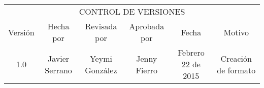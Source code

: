 %
\begin{table}[H]
	\centering
	\begin{tabular}{| c | c | c | c | c | c | }
	\hline
	\multicolumn{6}{c}{CONTROL DE VERSIONES} \\
	\cline{1-6}\noalign{\smallskip}
	\hline
	Versi\'on & Hecha por & Revisada por & Aprobada por & Fecha & Motivo \\ \hline
	 1.0 & Javier Serrano & Yeymi Gonz\'alez & Jenny Fierro & Febrero 22 de 2015 & Creaci\'on de formato \\
	\hline
	\end{tabular}
\end{table}
%
